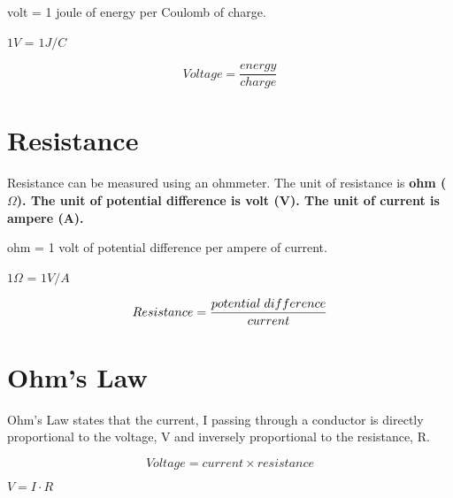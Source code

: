 \documentclass{report}
\begin{document}
\begin{flushleft}
\medskip

 volt = 1 joule of energy per Coulomb of charge. 

\smallskip $1V$ = $1J/C$

\begin{equation}
    Voltage = \frac{energy}{charge}
\end{equation}

\section*{Resistance}
\normalfont Resistance can be measured using an ohmmeter. The unit of resistance is \bf{ohm ($\Omega$)}. \normalfont The unit of potential difference is volt (V). The unit of current is ampere (A). 

\medskip

 ohm = 1 volt of potential difference per ampere of current.

\smallskip $1\Omega$ = $1V/A$

\begin{equation}
    Resistance = \frac{potential \hspace{1mm} difference}{current}
\end{equation}

\section*{Ohm's Law}
\normalfont Ohm's Law states that the current, I passing through a conductor is directly proportional to the voltage, V and inversely proportional to the resistance, R. 

\begin{equation}
    Voltage = current \times resistance 
\end{equation}

\centering $V = I \cdot R$

\end{flushleft}
\end{document}
